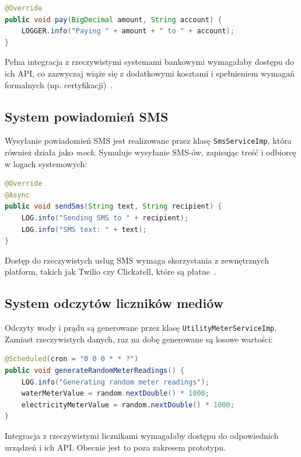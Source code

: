 \begin{lstlisting}[language=Java, caption=Fragment klasy \texttt{BankingServiceImp}]
@Override
public void pay(BigDecimal amount, String account) {
    LOGGER.info("Paying " + amount + " to " + account);
}
\end{lstlisting}

Pełna integracja z rzeczywistymi systemami bankowymi wymagałaby dostępu do ich API, co zazwyczaj wiąże się z dodatkowymi kosztami i spełnieniem wymagań formalnych (np. certyfikacji)~\cite{paypal_api, stripe_api}.

\subsection{System powiadomień SMS}

Wysyłanie powiadomień SMS jest realizowane przez klasę \texttt{SmsServiceImp}, która również działa jako \emph{mock}. Symuluje wysyłanie SMS-ów, zapisując treść i odbiorcę w logach systemowych:

\begin{lstlisting}[language=Java, caption=Fragment klasy \texttt{SmsServiceImp}]
@Override
@Async
public void sendSms(String text, String recipient) {
    LOG.info("Sending SMS to " + recipient);
    LOG.info("SMS text: " + text);
}
\end{lstlisting}

Dostęp do rzeczywistych usług SMS wymaga skorzystania z zewnętrznych platform, takich jak Twilio czy Clickatell, które są płatne~\cite{twilio, clickatell}.

\subsection{System odczytów liczników mediów}

Odczyty wody i prądu są generowane przez klasę \texttt{UtilityMeterServiceImp}. Zamiast rzeczywistych danych, raz na dobę generowane są losowe wartości:

\begin{lstlisting}[language=Java, caption=Fragment klasy \texttt{UtilityMeterServiceImp}]
@Scheduled(cron = "0 0 0 * * ?")
public void generateRandomMeterReadings() {
    LOG.info("Generating random meter readings");
    waterMeterValue = random.nextDouble() * 1000;
    electricityMeterValue = random.nextDouble() * 1000;
}
\end{lstlisting}

Integracja z rzeczywistymi licznikami wymagałaby dostępu do odpowiednich urządzeń i ich API. Obecnie jest to poza zakresem prototypu.

